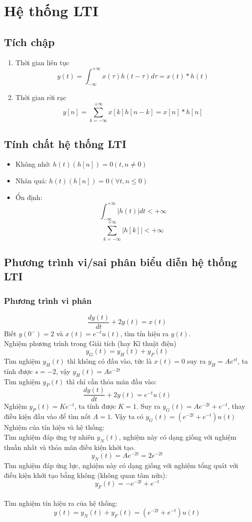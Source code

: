 \documentclass{article}
\begin{document}
\section{Hệ thống LTI}
\subsection{Tích chập}
\begin{enumerate}
    \item Thời gian liên tục
    $$y(t)=\int_{-\infty}^{+\infty}x(\tau)h(t-\tau)d\tau=x(t)*h(t)$$
    \item Thời gian rời rạc
    $$y[n]=\sum_{k=-\infty}^{+\infty}x[k]h[n-k]=x[n]*h[n]$$
\end{enumerate}
\subsection{Tính chất hệ thống LTI}
\begin{itemize}
    \item Không nhớ: $h(t) (h[n])=0 (t,n\neq 0)$
    \item Nhân quả: $h(t) (h[n])=0(\forall t,n\leq 0)$
    \item Ổn định:
    $$\int_{-\infty}^{+\infty}|h(t)|dt<+\infty$$
    $$\sum_{k=-\infty}^{+\infty}|h[k]|<+\infty$$
\end{itemize}
\subsection{Phương trình vi/sai phân biểu diễn hệ thống LTI}
\subsubsection{Phương trình vi phân}
$$\frac{dy(t)}{dt}+2y(t)=x(t)$$
Biết $y(0^{-})=2$ và $x(t)=e^{-t}u(t)$, tìm tín hiệu ra $y(t)$.
\\Nghiệm phương trình trong Giải tích (hay Kĩ thuật điện)
$$y_{G}(t)=y_{H}(t)+y_{P}(t)$$
Tìm nghiệm $y_{H}(t)$ thì không có đầu vào, tức là $x(t)=0$ suy ra
$y_{H}=Ae^{st}$, ta tính được $s=-2$, vậy $y_{H}(t)=Ae^{-2t}$
\\Tìm nghiệm $y_{P}(t)$ thì chỉ cần thỏa mãn đầu vào:
$$\frac{dy(t)}{dt}+2y(t)=e^{-t}u(t)$$
Nghiệm $y_{P}(t)=Ke^{-t}$, ta tính được $K=1$. Suy ra $y_{G}(t)=Ae^{-2t}+e^{-t}$, thay điều kiện đầu vào để tìm nốt $A=1$.
Vậy ta có $y_{G}(t)=(e^{-2t}+e^{-t})u(t)$
\\Nghiệm của tín hiệu và hệ thống:\\
Tìm nghiệm đáp ứng tự nhiên $y_{N}(t)$, nghiệm này có dạng giống với nghiệm thuần nhất và thỏa mãn điều kiện khởi tạo.
$$y_{N}(t)=Ae^{-2t}=2e^{-2t}$$
Tìm nghiệm đáp ứng lực, nghiệm này có dạng giống với nghiệm tổng quát với điều kiện khởi tạo bằng không (không quan tâm nữa):
$$y_{F}(t)=-e^{-2t}+e^{-t}$$
\\Tìm nghiệm tín hiệu ra của hệ thống:
$$y(t)=y_{N}(t)+y_{F}(t)=(e^{-2t}+e^{-t})u(t)$$
\end{document}
